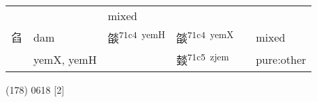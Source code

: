 \documentclass[14pt,a4paper]{scrartcl}
\begin{document}
\begin{longtable}[c]{@{}llllll@{}}
\begin{minipage}[t]{0.14\columnwidth}
\strut\end{minipage} &
\begin{minipage}[t]{0.14\columnwidth}\raggedright\strut
\strut\end{minipage} &
\begin{minipage}[t]{0.14\columnwidth}\raggedright\strut
mixed
\strut\end{minipage}\tabularnewline
\begin{minipage}[t]{0.14\columnwidth}\raggedright\strut
臽
\strut\end{minipage} &
\begin{minipage}[t]{0.14\columnwidth}\raggedright\strut
dam
\strut\end{minipage} &
\begin{minipage}[t]{0.14\columnwidth}\raggedright\strut
燄\textsuperscript{71c4~yemH}
\strut\end{minipage} &
\begin{minipage}[t]{0.14\columnwidth}\raggedright\strut
燄\textsuperscript{71c4~yemX}
\strut\end{minipage} &
\begin{minipage}[t]{0.14\columnwidth}\raggedright\strut
\strut\end{minipage} &
\begin{minipage}[t]{0.14\columnwidth}\raggedright\strut
mixed
\strut\end{minipage}\tabularnewline
\begin{minipage}[t]{0.14\columnwidth}\raggedright\strut
𤍽
\strut\end{minipage} &
\begin{minipage}[t]{0.14\columnwidth}\raggedright\strut
yemX, yemH
\strut\end{minipage} &
\begin{minipage}[t]{0.14\columnwidth}\raggedright\strut
\strut\end{minipage} &
\begin{minipage}[t]{0.14\columnwidth}\raggedright\strut
燅\textsuperscript{71c5~zjem}
\strut\end{minipage} &
\begin{minipage}[t]{0.14\columnwidth}\raggedright\strut
\strut\end{minipage} &
\begin{minipage}[t]{0.14\columnwidth}\raggedright\strut
pure:other
\strut\end{minipage}\tabularnewline
\bottomrule
\end{longtable}

(178) 0618 {[}2{]}
\end{document}
